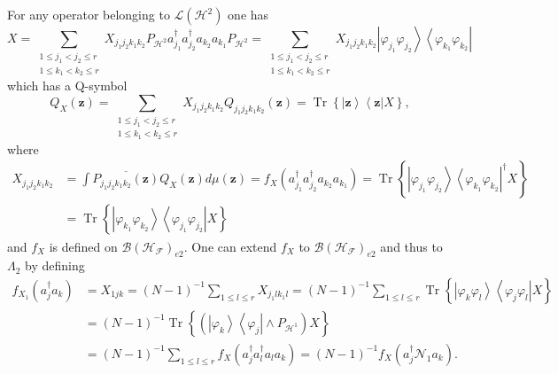 \documentclass[aps,preprint]{revtex4}%
\begin{document}
For any operator belonging to $\mathcal{L}\left(  \mathcal{H}^{2}\right)  $
one has
\begin{equation}
X=\sum_{\substack{1\leq j_{1}<j_{2}\leq r\\1\leq k_{1}<k_{2}\leq r}%
}X_{j_{1}j_{2}k_{1}k_{2}}P_{\mathcal{H}^{2}}a_{j_{1}}^{\dagger}a_{j_{2}%
}^{\dagger}a_{k_{2}}a_{k_{1}}P_{\mathcal{H}^{2}}=\sum_{\substack{1\leq
j_{1}<j_{2}\leq r\\1\leq k_{1}<k_{2}\leq r}}X_{j_{1}j_{2}k_{1}k_{2}}\left\vert
\varphi_{j_{1}}\varphi_{j_{2}}\right\rangle \left\langle \varphi_{k_{1}%
}\varphi_{k_{2}}\right\vert
\end{equation}
which has a Q-symbol
\begin{equation}
Q_{X}\left(  \mathbf{z}\right)  =\sum_{\substack{1\leq j_{1}<j_{2}\leq
r\\1\leq k_{1}<k_{2}\leq r}}X_{j_{1}j_{2}k_{1}k_{2}}Q_{j_{1}j_{2}k_{1}k_{2}%
}\left(  \mathbf{z}\right)  =\operatorname*{Tr}\left\{  \left\vert
\mathbf{z}\right\rangle \left\langle \mathbf{z}\right\vert X\right\}  ,
\end{equation}
where%
\begin{align}
X_{j_{1}j_{2}k_{1}k_{2}}  &  =\int\overline{P_{j_{1}j_{2}k_{1}k_{2}}\left(
\mathbf{z}\right)  }Q_{X}\left(  \mathbf{z}\right)  d\mu\left(  \mathbf{z}%
\right)  =f_{X}\left(  a_{j_{1}}^{\dagger}a_{j_{2}}^{\dagger}a_{k_{2}}%
a_{k_{1}}\right)  =\operatorname*{Tr}\left\{  \left\vert \varphi_{j_{1}%
}\varphi_{j_{2}}\right\rangle \left\langle \varphi_{k_{1}}\varphi_{k_{2}%
}\right\vert ^{\dagger}X\right\} \nonumber\\
&  =\operatorname*{Tr}\left\{  \left\vert \varphi_{k_{1}}\varphi_{k_{2}%
}\right\rangle \left\langle \varphi_{j_{1}}\varphi_{j_{2}}\right\vert
X\right\}
\end{align}
and $f_{X}$ is defined on $\mathcal{B}\left(  \mathcal{H}_{\mathcal{F}%
}\right)  _{e2}.$ One can extend $f_{X}$ to $\mathcal{B}\left(  \mathcal{H}%
_{\mathcal{F}}\right)  _{e2}$ and thus to $\Lambda_{2}$ by defining
\begin{align}
f_{X_{1}}\left(  a_{j}^{\dagger}a_{k}\right)   &  =X_{1jk}=\left(  N-1\right)
^{-1}\sum_{1\leq l\leq r}X_{j_{1}lk_{1}l}=\left(  N-1\right)  ^{-1}\sum_{1\leq
l\leq r}\operatorname*{Tr}\left\{  \left\vert \varphi_{k}\varphi
_{l}\right\rangle \left\langle \varphi_{j}\varphi_{l}\right\vert X\right\}
\nonumber\\
&  =\left(  N-1\right)  ^{-1}\operatorname*{Tr}\left\{  \left(  \left\vert
\varphi_{k}\right\rangle \left\langle \varphi_{j}\right\vert \wedge
P_{\mathcal{H}^{1}}\right)  X\right\} \nonumber\\
&  =\left(  N-1\right)  ^{-1}\sum_{1\leq l\leq r}f_{X}\left(  a_{j}^{\dagger
}a_{l}^{\dagger}a_{l}a_{k}\right)  =\left(  N-1\right)  ^{-1}f_{X}\left(
a_{j}^{\dagger}\mathcal{N}_{1}a_{k}\right)  .
\end{align}%
\end{document}
